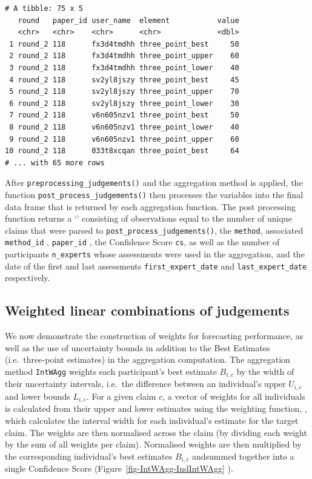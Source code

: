 \documentclass[article]{jss}
\newcommand{\class}[1]{`\code{#1}'}
\newcommand{\fct}[1]{\code{#1()}}
\begin{document}
\begin{tcolorbox}[enhanced jigsaw, arc=.35mm, toprule=.15mm, breakable, opacityback=0, colframe=quarto-callout-color-frame, rightrule=.15mm, colback=white, left=2mm, bottomrule=.15mm, leftrule=.75mm]
\begin{verbatim}
# A tibble: 75 x 5
   round   paper_id user_name  element           value
   <chr>   <chr>    <chr>      <chr>             <dbl>
 1 round_2 118      fx3d4tmdhh three_point_best     50
 2 round_2 118      fx3d4tmdhh three_point_upper    60
 3 round_2 118      fx3d4tmdhh three_point_lower    40
 4 round_2 118      sv2yl8jszy three_point_best     45
 5 round_2 118      sv2yl8jszy three_point_upper    70
 6 round_2 118      sv2yl8jszy three_point_lower    30
 7 round_2 118      v6n605nzv1 three_point_best     50
 8 round_2 118      v6n605nzv1 three_point_lower    40
 9 round_2 118      v6n605nzv1 three_point_upper    60
10 round_2 118      033t8xcqan three_point_best     64
# ... with 65 more rows
\end{verbatim}

After \texttt{preprocessing\_judgements()} and the aggregation method is
applied, the function \texttt{post\_process\_judgements()} then
processes the variables into the final data frame that is returned by
each aggregation function. The post processing function returns a
\class{tibble} consisting of observations equal to the number of unique
claims that were parsed to \texttt{post\_process\_judgements()}, the
\texttt{method}, associated \texttt{method\_id} , \texttt{paper\_id} ,
the Confidence Score \texttt{cs}, as well as the number of participants
\texttt{n\_experts} whose assessments were used in the aggregation, and
the date of the first and last assessments \texttt{first\_expert\_date}
and \texttt{last\_expert\_date} respectively.

\end{tcolorbox}

\hypertarget{sec-IntWAgg}{%
\subsection{Weighted linear combinations of
judgements}\label{sec-IntWAgg}}

We now demonstrate the construction of weights for forecasting
performance, as well as the use of uncertainty bounds in addition to the
Best Estimates (i.e.~three-point estimates) in the aggregation
computation. The aggregation method \texttt{IntWAgg} weights each
participant's best estimate \(B_{i,c}\) by the width of their
uncertainty intervals, i.e.~the difference between an individual's upper
\({U}_{i,c}\) and lower bounds \({L}_{i,c}\). For a given claim \(c\), a
vector of weights for all individuals is calculated from their upper and
lower estimates using the weighting function, \fct{weight\_interval},
which calculates the interval width for each individual's estimate for
the target claim. The weights are then normalised across the claim (by
dividing each weight by the sum of all weights per claim). Normalised
weights are then multiplied by the corresponding individual's best
estimates \(B_{i,c}\) andsummed together into a single Confidence Score
(Figure~\ref{fig-IntWAgg-IndIntWAgg} ).
\end{document}
